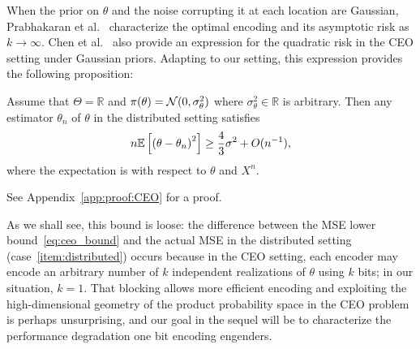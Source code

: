 When the prior on $\theta$ and the noise corrupting it at each location are
Gaussian, Prabhakaran et al.~\cite{prabhakaran2004rate} characterize the
optimal encoding and its asymptotic risk as $k \to \infty$.  Chen et
al.~\cite{chen2004upper} also provide an expression for the quadratic risk
in the CEO setting under Gaussian priors. Adapting to our setting, this
expression provides the following proposition:
\begin{prop} \label{prop:CEO}
  Assume that $\Theta = \mathbb R$ and $\pi(\theta) =
  \mathcal{N}(0,\sigma_\theta^2)$ where $\sigma_\theta^2 \in \mathbb R$ is
  arbitrary. Then any estimator ${\theta}_n$ of $\theta$ in the distributed
  setting satisfies
  \begin{equation} \label{eq:ceo_bound}
    n \mathbb{E}\left[ \left( \theta - \theta_n \right)^2\right] \geq \frac{4}{3} \sigma^2 + O(n^{-1}),
  \end{equation}
  where the expectation is with respect to $\theta$ and $X^n$.
\end{prop}
\noindent
See Appendix~\ref{app:proof:CEO} for a proof.

As we shall see, this bound is loose: the difference between the MSE lower
bound~\eqref{eq:ceo_bound} and the actual MSE in the distributed setting
(case~\eqref{item:distributed}) occurs because in the CEO setting, each
encoder may encode an arbitrary number of $k$ independent realizations of
$\theta$ using $k$ bits; in our situation, $k = 1$. That blocking allows
more efficient encoding and exploiting the high-dimensional geometry of the
product probability space in the CEO problem is perhaps unsurprising, and
our goal in the sequel will be to characterize the performance degradation
one bit encoding engenders.
